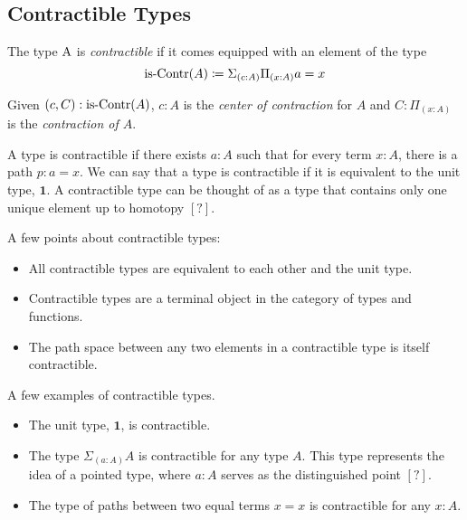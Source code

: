 \documentclass{article}
\begin{document}
\subsection{Contractible Types}

\begin{definition}
  The type $\operatorname{A}$ is \emph{contractible} if it comes equipped with an element of the type
  \begin{equation*}
    \is-Contr(A) \coloneq \Sigma_{(c : A)}\Pi_{(x : A)} a = x
  \end{equation*}

  Given $(c, C) : \is-Contr(A)$, $c : A$ is the \emph{center of contraction} for $A$ and $C : \Pi_{(x : A)}$ is the \emph{contraction of $A$}.
\end{definition}
\begin{remark}[Intuition]
  A type is contractible if there exists $a : A$ such that for every term $x : A$, there is a path $p : a = x$. We can say that a type is contractible if it is equivalent to the unit type, $\mathbf{1}$. A contractible type can be thought of as a type that contains only one unique element up to homotopy $\mathbf{[?]}$.
\end{remark}

\begin{remark}[Properties]
  A few points about contractible types:
  \begin{itemize}
    \item All contractible types are equivalent to each other and the unit type.

    \item Contractible types are a terminal object in the category of types and functions.

    \item The path space between any two elements in a contractible type is itself contractible.
  \end{itemize}
\end{remark}
\begin{remark}[Examples]
   A few examples of contractible types.
  \begin{itemize}
    \item The unit type, $\mathbf{1}$, is contractible.

    \item The type $\Sigma_{(a : A)} A$ is contractible for any type $A$. This type represents the idea of a pointed type, where $a : A$ serves as the distinguished point $\mathbf{[?]}$.

    \item The type of paths between two equal terms $x = x$ is contractible for any $x : A$.

  \end{itemize}
\end{remark}
\end{document}
